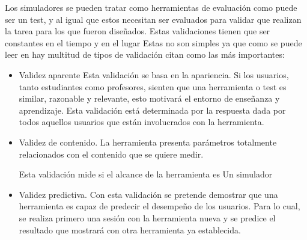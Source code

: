 Los simuladores se pueden tratar como herramientas de evaluación como puede ser un test, y al igual que estos necesitan ser evaluados para validar que realizan la tarea para los que fueron diseñados. Estas validaciones tienen que ser constantes en el tiempo y en el lugar 
Estas no son simples ya que como se puede leer en \cite{pales2010uso}  hay multitud de tipos de validación citan como las más importantes:
\begin{itemize}
    \item Validez aparente
    Esta validación se basa en la apariencia. Si los usuarios, tanto estudiantes como profesores, sienten que una herramienta o test es similar, razonable y relevante, esto motivará el entorno de enseñanza y aprendizaje. Esta validación está determinada por la respuesta dada por todos aquellos usuarios que están involucrados con la herramienta.
    
    \item Validez de contenido. La herramienta presenta parámetros totalmente relacionados con el contenido que se quiere medir.
    
    Esta validación mide si el alcance de la herramienta es 
    Un simulador 
    
    
    \item Validez predictiva.
    Con esta validación se pretende demostrar que una herramienta  es capaz de predecir el desempeño de los usuarios. Para lo cual, se realiza primero una sesión con la herramienta nueva y se predice el resultado que mostrará con otra herramienta ya establecida.
    


\end{itemize}
